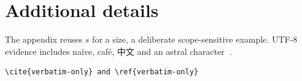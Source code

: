 \section{Additional details}\label{sec:appendix}
The appendix reuses $s$ for a size, a deliberate scope-sensitive example.
UTF-8 evidence includes naïve, café, 中文 and an astral character 🧪.

\begin{verbatim}
\cite{verbatim-only} and \ref{verbatim-only}
\end{verbatim}
